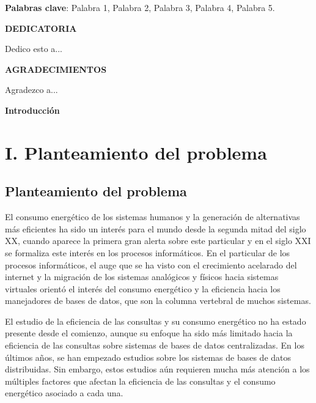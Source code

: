 \documentclass[12pt, letter paper]{report}
\begin{document}
  \textbf{Palabras clave}: Palabra 1, Palabra 2, Palabra 3, Palabra 4, Palabra
  5.
  \newpage
  \begin{center}
    \large \textbf{DEDICATORIA}
  \end{center}

  Dedico esto a...

  \newpage
  \begin{center}
    \Large \textbf{AGRADECIMIENTOS}
  \end{center}

  Agradezco a...

  \tableofcontents

  \newpage
  \begin{center}
    \Large \textbf{Introducción}
  \end{center}

  \chapter{I. Planteamiento del problema} %
  \label{cha:i_planteamiento_del_problema}
    \section{Planteamiento del problema} %
    \label{sec:planteamiento_del_problema}
        El consumo energético de los sistemas humanos y la generación de
        alternativas más eficientes ha sido un interés para el mundo desde la
        segunda mitad del siglo XX, cuando aparece la primera gran alerta sobre
        este particular y en el siglo XXI se formaliza este interés en los
        procesos informáticos. En el particular de los procesos informáticos, el
        auge que se ha visto con el crecimiento acelarado del internet y la
        migración de los sistemas analógicos y físicos hacia sistemas virtuales
        orientó el interés del consumo energético y la eficiencia hacia los
        manejadores de bases de datos, que son la columna vertebral de muchos
        sistemas.

        El estudio de la eficiencia de las consultas y su consumo energético no
        ha estado presente desde el comienzo, aunque su enfoque ha sido más
        limitado hacia la eficiencia de las consultas sobre sistemas de bases de
        datos centralizadas. En los últimos años, se han empezado estudios sobre
        los sistemas de bases de datos distribuidas. Sin embargo, estos estudios
        aún requieren mucha más atención a los múltiples factores que afectan la
        eficiencia de las consultas y el consumo energético asociado a cada una.
\end{document}
